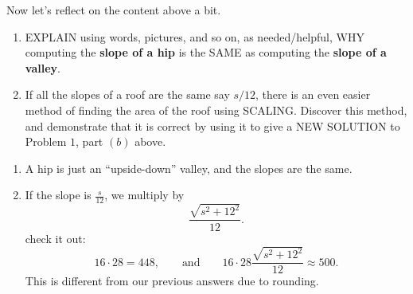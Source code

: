 \documentclass[hints,nooutcomes,noauthor]{ximera}
\begin{document}
\begin{question}
  Now let's reflect on the content above a bit.
  \begin{enumerate}
    \item EXPLAIN using words, pictures, and so on, as needed/helpful,
      WHY computing the \textbf{slope of a hip} is the SAME as computing the
      \textbf{slope of a valley}.
    \item If all the slopes of a roof are the same say $s/12$, there
      is an even easier method of finding the area of the roof using
      SCALING. Discover this method, and demonstrate that it is
      correct by using it to give a NEW SOLUTION to Problem $1$, part
      $(b)$ above.
  \end{enumerate}
  \begin{freeResponse}
    \begin{enumerate}
  \item A hip is just an ``upside-down'' valley, and the slopes are
    the same.
  \item If the slope is $\frac{s}{12}$, we multiply by
    \[
    \frac{\sqrt{s^2+12^2}}{12}.
    \]
    check it out:
    \[
    16\cdot 28 = 448,\qquad\text{and}\qquad  16\cdot 28 \frac{\sqrt{s^2+12^2}}{12} \approx 500.
    \]
    This is different from our previous answers due to rounding.
    \end{enumerate}
  \end{freeResponse}
\end{question}
\end{document}
